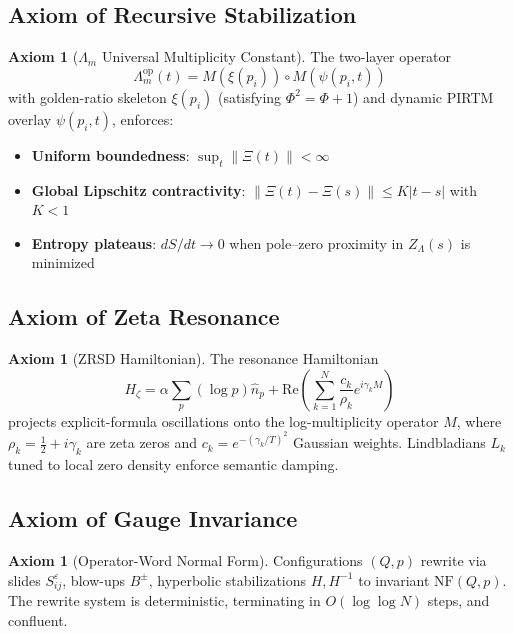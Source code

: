 \documentclass[11pt,a4paper]{article}
\theoremstyle{plain}
\theoremstyle{definition}
\newtheorem{axiom}[theorem]{Axiom}
\theoremstyle{remark}
\begin{document}
\subsection{Axiom of Recursive Stabilization}

\begin{axiom}[\(\Lambda_m\) Universal Multiplicity Constant]\label{ax:lambda}
The two-layer operator
\[
\Lambda_m^{\text{op}}(t) = M(\xi(p_i)) \circ M(\psi(p_i, t))
\]
with golden-ratio skeleton \(\xi(p_i)\) (satisfying \(\Phi^2 = \Phi + 1\)) and dynamic PIRTM overlay \(\psi(p_i,t)\), enforces:
\begin{itemize}[leftmargin=*]
\item \textbf{Uniform boundedness}: \(\sup_t \|\Xi(t)\| < \infty\)
\item \textbf{Global Lipschitz contractivity}: \(\|\Xi(t) - \Xi(s)\| \leq K|t-s|\) with \(K < 1\)
\item \textbf{Entropy plateaus}: \(dS/dt \to 0\) when pole--zero proximity in \(Z_\Lambda(s)\) is minimized
\end{itemize}
\end{axiom}

\subsection{Axiom of Zeta Resonance}

\begin{axiom}[ZRSD Hamiltonian]\label{ax:zeta}
The resonance Hamiltonian
\[
H_\zeta = \alpha \sum_p (\log p) \hat{n}_p + \text{Re}\left(\sum_{k=1}^N \frac{c_k}{\rho_k} e^{i\gamma_k M}\right)
\]
projects explicit-formula oscillations onto the log-multiplicity operator \(M\), where \(\rho_k = \tfrac{1}{2} + i\gamma_k\) are zeta zeros and \(c_k = e^{-(\gamma_k/T)^2}\) Gaussian weights. Lindbladians \(L_k\) tuned to local zero density enforce semantic damping.
\end{axiom}

\subsection{Axiom of Gauge Invariance}

\begin{axiom}[Operator-Word Normal Form]\label{ax:nf}
Configurations \((Q, p)\) rewrite via slides \(S_{ij}^\varepsilon\), blow-ups \(B^\pm\), hyperbolic stabilizations \(H, H^{-1}\) to invariant \(\text{NF}(Q,p)\). The rewrite system is deterministic, terminating in \(O(\log \log N)\) steps, and confluent.
\end{axiom}
\end{document}
